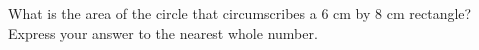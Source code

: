 What is the area of the circle that circumscribes a $6$ cm by $8$ cm rectangle? Express your answer to the nearest whole number.
